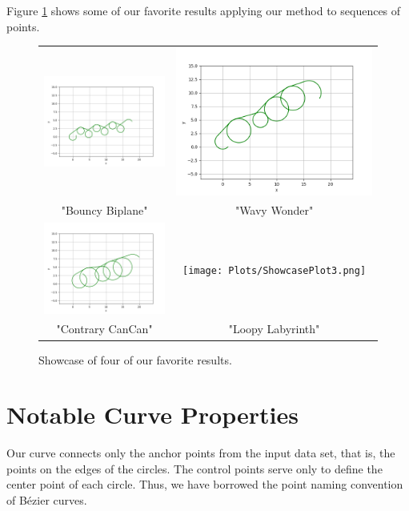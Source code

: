 \documentclass{article}
\begin{document}
Figure \ref{fig:showcse_plots} shows some of our favorite results applying our method to sequences of points.

\begin{center}
\begin{figure}[ht]
\centering
\begin{tabular}{cc}

\includegraphics[width=0.4\linewidth]{Plots/ShowcasePlot1.png} &
\includegraphics[width=0.4\linewidth]{Plots/ShowcasePlot4.png} \\
"Bouncy Biplane" & "Wavy Wonder" \\ %

\includegraphics[width=0.4\linewidth]{Plots/ShowcasePlot2.png} &
\texttt{[image: Plots/ShowcasePlot3.png]} \\
"Contrary CanCan" & "Loopy Labyrinth" \\ %

\end{tabular}
\caption{Showcase of four of our favorite results.}
\label{fig:showcse_plots}
\end{figure}
\end{center}


\section{Notable Curve Properties}
Our curve connects only the anchor points from the input data set, that is, the points on the edges of the circles. The control points serve only to define the center point of each circle. Thus, we have borrowed the point naming convention  of B\'ezier curves.
\end{document}
